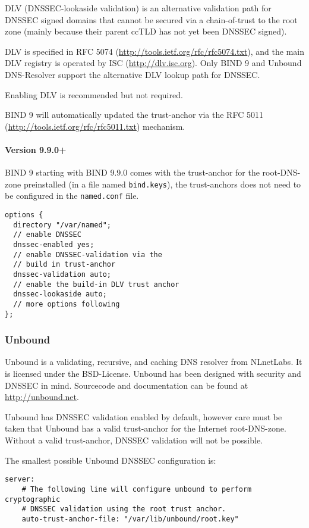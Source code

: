 DLV (DNSSEC-lookaside validation) is an alternative validation path
for DNSSEC signed domains that cannot be secured via a chain-of-trust
to the root zone (mainly because their parent ccTLD has not yet been
DNSSEC signed).

DLV is specified in RFC 5074
(\url{http://tools.ietf.org/rfc/rfc5074.txt}), and the main DLV
registry is operated by ISC (\url{http://dlv.isc.org}). Only BIND 9
and Unbound DNS-Resolver support the alternative DLV lookup path for
DNSSEC.

Enabling DLV is recommended but not required.

BIND 9 will automatically updated the trust-anchor via the RFC 5011
(\url{http://tools.ietf.org/rfc/rfc5011.txt}) mechanism.

\paragraph{Version 9.9.0+}

BIND 9 starting with BIND 9.9.0 comes with the trust-anchor for the
root-DNS-zone preinstalled (in a file named \verb|bind.keys|), the
trust-anchors does not need to be configured in the \verb|named.conf|
file.

\begin{lstlisting}
options {
  directory "/var/named";
  // enable DNSSEC
  dnssec-enabled yes;
  // enable DNSSEC-validation via the
  // build in trust-anchor
  dnssec-validation auto;
  // enable the build-in DLV trust anchor
  dnssec-lookaside auto;
  // more options following
};
\end{lstlisting}

\subsubsection{Unbound}

Unbound is a validating, recursive, and caching DNS resolver from
NLnetLabs. It is licensed under the BSD-License. Unbound has been
designed with security and DNSSEC in mind. Sourcecode and
documentation can be found at \url{http://unbound.net}.

Unbound has DNSSEC validation enabled by default, however care must be
taken that Unbound has a valid trust-anchor for the Internet
root-DNS-zone. Without a valid trust-anchor, DNSSEC validation will
not be possible.

The smallest possible Unbound DNSSEC configuration is:
\begin{lstlisting}
server:
    # The following line will configure unbound to perform cryptographic
    # DNSSEC validation using the root trust anchor.
    auto-trust-anchor-file: "/var/lib/unbound/root.key"
\end{lstlisting}

